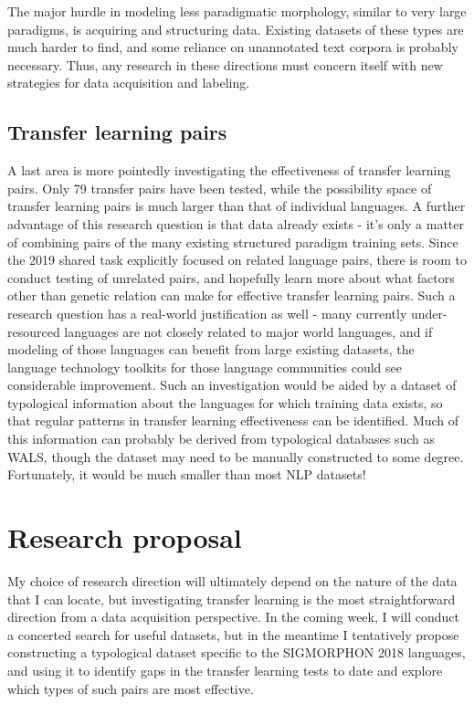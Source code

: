 The major hurdle in modeling less paradigmatic morphology, similar to very large paradigms, is acquiring and structuring data. Existing datasets of these types are much harder to find, and some reliance on unannotated text corpora is probably necessary. Thus, any research in these directions must concern itself with new strategies for data acquisition and labeling.

\subsection{Transfer learning pairs}

A last area is more pointedly investigating the effectiveness of transfer learning pairs. Only 79 transfer pairs have been tested, while the possibility space of transfer learning pairs is much larger than that of individual languages. A further advantage of this research question is that data already exists - it's only a matter of combining pairs of the many existing structured paradigm training sets. Since the 2019 shared task explicitly focused on related language pairs, there is room to conduct testing of unrelated pairs, and hopefully learn more about what factors other than genetic relation can make for effective transfer learning pairs. Such a research question has a real-world justification as well - many currently under-resourced languages are not closely related to major world languages, and if modeling of those languages can benefit from large existing datasets, the language technology toolkits for those language communities could see considerable improvement. Such an investigation would be aided by a dataset of typological information about the languages for which training data exists, so that regular patterns in transfer learning effectiveness can be identified. Much of this information can probably be derived from typological databases such as WALS, though the dataset may need to be manually constructed to some degree. Fortunately, it would be much smaller than most NLP datasets!

\section{Research proposal}

My choice of research direction will ultimately depend on the nature of the data that I can locate, but investigating transfer learning is the most straightforward direction from a data acquisition perspective. In the coming week, I will conduct a concerted search for useful datasets, but in the meantime I tentatively propose constructing a typological dataset specific to the SIGMORPHON 2018 languages, and using it to identify gaps in the transfer learning tests to date and explore which types of such pairs are most effective.